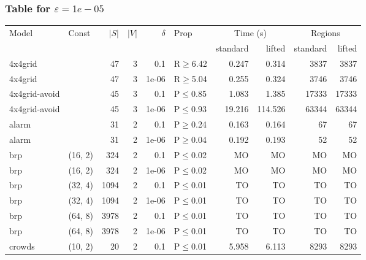 \subsubsection{Table for \(\varepsilon=1e-05\)}
\begin{longtable}{llrrrlrrrr}

        \toprule
        Model & Const & $|S|$ & $|V|$ & $\delta$ & Prop & \multicolumn{2}{c}{Time (s)} & \multicolumn{2}{c}{Regions} \\
        \cmidrule(ll){7-8} \cmidrule(ll){9-10}
        & & & & & & standard & lifted & standard & lifted \\
        \midrule
        
 4x4grid       &           &     	47 &   3 & 0.1   & R$\geq$6.42  & 0.247    & 0.314    & 3837    & 3837    \\
 4x4grid       &           &     	47 &   3 & 1e-06 & R$\geq$5.04  & 0.255    & 0.324    & 3746    & 3746    \\
 4x4grid-avoid &           &     	45 &   3 & 0.1   & P$\leq$0.85  & 1.083    & 1.385    & 17333   & 17333   \\
 4x4grid-avoid &           &     	45 &   3 & 1e-06 & P$\leq$0.93  & 19.216   & 114.526  & 63344   & 63344   \\
 alarm         &           &     	31 &   2 & 0.1   & P$\geq$0.24  & 0.163    & 0.164    & 67      & 67      \\
 alarm         &           &     	31 &   2 & 1e-06 & P$\geq$0.04  & 0.192    & 0.193    & 52      & 52      \\
 brp           & (16, 2)   &    	324 &   2 & 0.1   & P$\leq$0.02  & MO       & MO       & MO      & MO      \\
 brp           & (16, 2)   &    	324 &   2 & 1e-06 & P$\leq$0.02  & MO       & MO       & MO      & MO      \\
 brp           & (32, 4)   &   	1094 &   2 & 0.1   & P$\leq$0.01  & TO       & TO       & TO      & TO      \\
 brp           & (32, 4)   &   	1094 &   2 & 1e-06 & P$\leq$0.01  & TO       & TO       & TO      & TO      \\
 brp           & (64, 8)   &   	3978 &   2 & 0.1   & P$\leq$0.01  & TO       & TO       & TO      & TO      \\
 brp           & (64, 8)   &   	3978 &   2 & 1e-06 & P$\leq$0.01  & TO       & TO       & TO      & TO      \\
 crowds        & (10, 2)   &     	20 &   2 & 0.1   & P$\leq$0.01  & 5.958    & 6.113    & 8293    & 8293    \\

\end{longtable}
